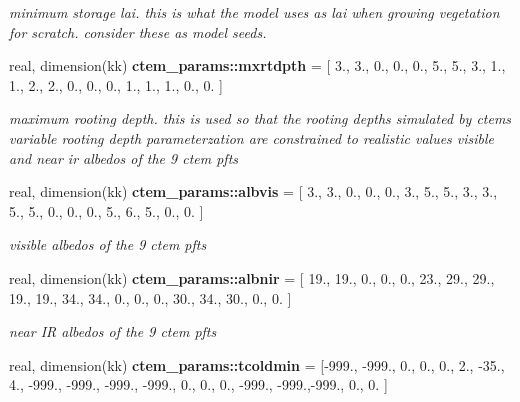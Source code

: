 \begin{DoxyCompactItemize}
\begin{DoxyCompactList}\small\item\em minimum storage lai. this is what the model uses as lai when growing vegetation for scratch. consider these as model seeds. \end{DoxyCompactList}\item 
\hypertarget{namespacectem__params_aa04ff0cae9a12857edb2bced344e57eb}{}real, dimension(kk) {\bfseries ctem\+\_\+params\+::mxrtdpth} = \mbox{[} 3., 3., 0., 0., 0., 5., 5., 3., 1., 1., 2., 2., 0., 0., 0., 1., 1., 1., 0., 0. \mbox{]}\label{namespacectem__params_aa04ff0cae9a12857edb2bced344e57eb}

\begin{DoxyCompactList}\small\item\em maximum rooting depth. this is used so that the rooting depths simulated by ctem\textquotesingle{}s variable rooting depth parameterzation are constrained to realistic values visible and near ir albedos of the 9 ctem pfts \end{DoxyCompactList}\item 
\hypertarget{namespacectem__params_a31818df48fa008f61e322e702577c978}{}real, dimension(kk) {\bfseries ctem\+\_\+params\+::albvis} = \mbox{[} 3., 3., 0., 0., 0., 3., 5., 5., 3., 3., 5., 5., 0., 0., 0., 5., 6., 5., 0., 0. \mbox{]}\label{namespacectem__params_a31818df48fa008f61e322e702577c978}

\begin{DoxyCompactList}\small\item\em visible albedos of the 9 ctem pfts \end{DoxyCompactList}\item 
\hypertarget{namespacectem__params_a40fb68ad0ca75f0de54aa2ced6257788}{}real, dimension(kk) {\bfseries ctem\+\_\+params\+::albnir} = \mbox{[} 19., 19., 0., 0., 0., 23., 29., 29., 19., 19., 34., 34., 0., 0., 0., 30., 34., 30., 0., 0. \mbox{]}\label{namespacectem__params_a40fb68ad0ca75f0de54aa2ced6257788}

\begin{DoxyCompactList}\small\item\em near I\+R albedos of the 9 ctem pfts \end{DoxyCompactList}\item 
\hypertarget{namespacectem__params_aa39eead45599d5797ad7bd80168fb657}{}real, dimension(kk) {\bfseries ctem\+\_\+params\+::tcoldmin} = \mbox{[}-\/999., -\/999., 0., 0., 0., 2., -\/35., 4., -\/999., -\/999., -\/999., -\/999., 0., 0., 0., -\/999., -\/999.,-\/999., 0., 0. \mbox{]}\label{namespacectem__params_aa39eead45599d5797ad7bd80168fb657}


\end{DoxyCompactItemize}
